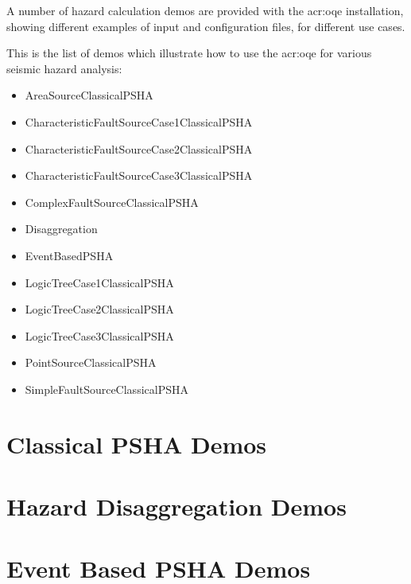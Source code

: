 A number of hazard calculation demos are provided with the \gls{acr:oqe}
installation,  showing different examples of input and configuration files,
for different use cases.

This is the list of demos which illustrate how to use the \gls{acr:oqe} for
various seismic hazard analysis:

\begin{itemize}

    \item AreaSourceClassicalPSHA
    \item CharacteristicFaultSourceCase1ClassicalPSHA
    \item CharacteristicFaultSourceCase2ClassicalPSHA
    \item CharacteristicFaultSourceCase3ClassicalPSHA
    \item ComplexFaultSourceClassicalPSHA
    \item Disaggregation
    \item EventBasedPSHA
    \item LogicTreeCase1ClassicalPSHA
    \item LogicTreeCase2ClassicalPSHA
    \item LogicTreeCase3ClassicalPSHA
    \item PointSourceClassicalPSHA
    \item SimpleFaultSourceClassicalPSHA

\end{itemize}

\section{Classical PSHA Demos}
\label{sec:demos_classical_psha}


\section{Hazard Disaggregation Demos}
\label{sec:demos_hazard_disaggregation}


\section{Event Based PSHA Demos}
\label{sec:demos_event_based_psha}


% 
